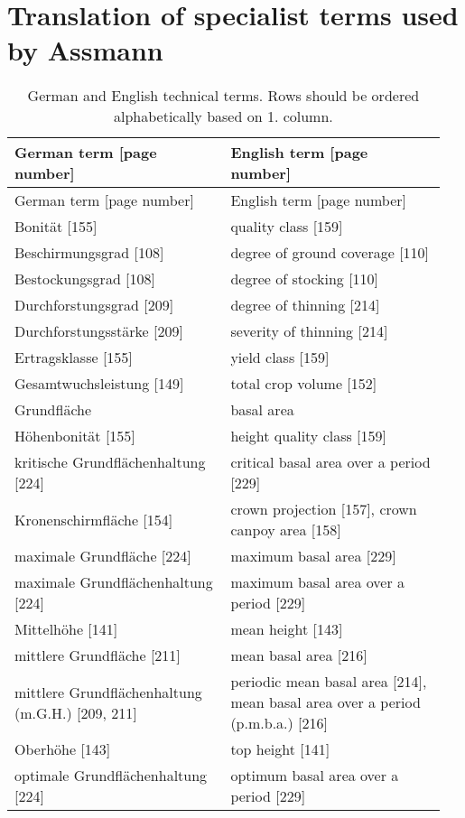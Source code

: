 \section{Translation of specialist terms used by Assmann}

\begin{singlespace}
  {\tabulinesep=2mm
    \begin{longtabu}{p{0.475\linewidth} p{0.475\linewidth}}
      \caption{German \parencite{Assmann1961} and English \parencite{Assmann1970} technical terms.  Rows should be ordered alphabetically based on 1. column.} \\
      \toprule
      German term [page number] & English term [page number] \\
      \midrule
      \endfirsthead
      German term [page number] & English term [page number] \\
      \midrule
      \endhead
      \bottomrule
      \endlastfoot
      Bonität [155] & quality class [159] \\
      Beschirmungsgrad [108] & degree of ground coverage [110] \\
      Bestockungsgrad [108] & degree of stocking [110] \\
      Durchforstungsgrad [209] & degree of thinning [214] \\
      Durchforstungsstärke [209] & severity of thinning [214] \\
      Ertragsklasse [155] & yield class [159] \\
      Gesamtwuchsleistung [149] & total crop volume [152] \\
      Grundfläche & basal area \\
      Höhenbonität [155] & height quality class [159] \\
      kritische Grundflächenhaltung [224] & critical basal area over a period [229] \\
      Kronenschirmfläche [154] &  crown projection [157], crown canpoy area [158] \\
      maximale Grundfläche [224] & maximum basal area [229] \\
      maximale Grundflächenhaltung [224] & maximum basal area over a period [229] \\
      Mittelhöhe [141] & mean height [143] \\
      mittlere Grundfläche [211] & mean basal area [216] \\
      mittlere Grundflächenhaltung (m.G.H.) [209, 211] & periodic mean basal area [214], mean basal area over a period (p.m.b.a.) [216] \\
      Oberhöhe [143] & top height [141] \\
      optimale Grundflächenhaltung [224] & optimum basal area over a period [229] \\
      
    \end{longtabu}
  }
\end{singlespace}

